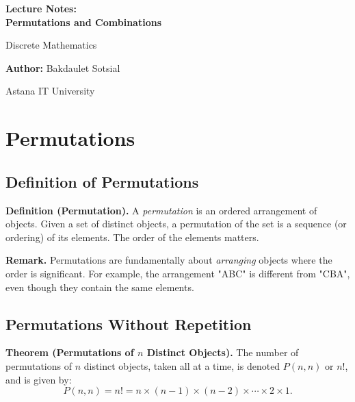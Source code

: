 \documentclass[11pt,a4paper]{article}
\begin{document}
\begin{titlepage}
    \centering
    \vspace*{4cm}
    
    {\Huge\bfseries Lecture Notes:\\ Permutations and Combinations\par}
    \vspace{1cm}
    {\Large Discrete Mathematics\par}
    \vspace{2cm}
    {\large \textbf{Author:} Bakdaulet Sotsial\par}
    \vspace{1cm}
    
    \vfill
    {\small Astana IT University \par}
    \vspace*{2cm}
\end{titlepage}

\tableofcontents
\newpage

\section{Permutations}

\subsection{Definition of Permutations}

\textbf{Definition (Permutation).} A \textit{permutation} is an ordered arrangement of objects. Given a set of distinct objects, a permutation of the set is a sequence (or ordering) of its elements. The order of the elements matters.

\textbf{Remark.} Permutations are fundamentally about \textit{arranging} objects where the order is significant. For example, the arrangement "ABC" is different from "CBA", even though they contain the same elements.

\subsection{Permutations Without Repetition}

\textbf{Theorem (Permutations of $n$ Distinct Objects).} The number of permutations of $n$ distinct objects, taken all at a time, is denoted $P(n, n)$ or $n!$, and is given by:
\begin{equation*}
    P(n, n) = n! = n \times (n-1) \times (n-2) \times \cdots \times 2 \times 1.
\end{equation*}
\end{document}
